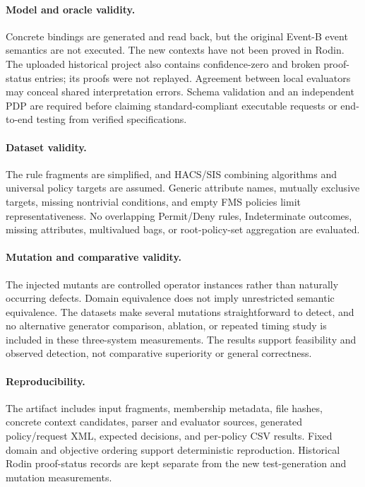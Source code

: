 \paragraph{Model and oracle validity.}
Concrete bindings are generated and read back, but the original
Event-B event semantics are not executed. The new contexts have not
been proved in Rodin. The uploaded historical project also contains
confidence-zero and broken proof-status entries; its proofs were not
replayed. Agreement between local evaluators may conceal shared
interpretation errors. Schema validation and an independent PDP are
required before claiming standard-compliant executable requests or
end-to-end testing from verified specifications.

\paragraph{Dataset validity.}
The rule fragments are simplified, and HACS/SIS combining algorithms
and universal policy targets are assumed. Generic attribute names,
mutually exclusive targets, missing nontrivial conditions, and empty
FMS policies limit representativeness. No overlapping Permit/Deny
rules, Indeterminate outcomes, missing attributes, multivalued bags,
or root-policy-set aggregation are evaluated.

\paragraph{Mutation and comparative validity.}
The injected mutants are controlled operator instances rather than
naturally occurring defects. Domain equivalence does not imply
unrestricted semantic equivalence. The datasets make several mutations
straightforward to detect, and no alternative generator comparison,
ablation, or repeated timing study is included in these three-system
measurements. The results support feasibility and observed detection,
not comparative superiority or general correctness.

\paragraph{Reproducibility.}
The artifact includes input fragments, membership metadata, file hashes,
concrete context candidates, parser and evaluator sources, generated
policy/request XML, expected decisions, and per-policy CSV results.
Fixed domain and objective ordering support deterministic reproduction.
Historical Rodin proof-status records are kept separate from the
new test-generation and mutation measurements.
